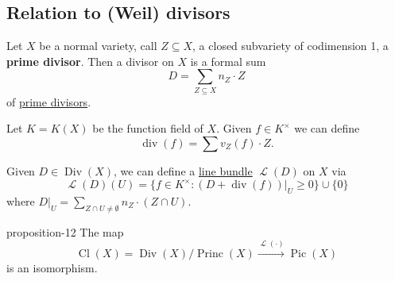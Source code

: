 \documentclass[10pt,]{book}
\newcommand{\terminology}[1]{\textbf{#1}}
\numberwithin{equation}{section}
\newcommand{\sheaf}[1]{\operatorname{\mathcal{#1}}}
\DeclareMathOperator{\divisor}{div}
\DeclareMathOperator{\Cl}{Cl}
\DeclareMathOperator{\Div}{Div}
\DeclareMathOperator{\Pic}{Pic}
\DeclareMathOperator{\Princ}{Princ}
\begin{document}
\subsection[{Relation to (Weil) divisors}]{Relation to (Weil) divisors}\label{sec-reln-weil}
\hypertarget{p-118}{}%
Let \(X\) be a normal variety, call \(Z\subseteq X\), a closed subvariety of codimension 1, a \terminology{prime divisor}. Then a divisor on \(X\) is a formal sum%
\begin{equation*}
D = \sum_{Z\subseteq X} n_Z\cdot Z
\end{equation*}
of \hyperref[sec-reln-weil]{prime divisors}.%
\par
\hypertarget{p-119}{}%
Let \(K = K(X)\) be the function field of \(X\). Given \(f\in K^\times\) we can define%
\begin{equation*}
\divisor (f) = \sum v_Z(f) \cdot Z\text{.}
\end{equation*}
%
\par
\hypertarget{p-120}{}%
Given \(D \in \Div(X)\), we can define a \hyperref[def-line-bundle]{line bundle} \(\sheaf L(D)\) on \(X\) via%
\begin{equation*}
\sheaf L(D)(U) = \{f\in K^\times : (D + \divisor (f))|_U\ge 0 \} \cup \{0\}
\end{equation*}
where \(D|_U = \sum_{Z\cap U\ne \emptyset} n_Z\cdot (Z\cap U)\).%
\begin{proposition}{}{}{proposition-12}%
\hypertarget{p-121}{}%
The map%
\begin{equation*}
\Cl(X) = \Div(X)/\Princ(X) \xrightarrow{\sheaf L(\cdot)} \Pic(X)
\end{equation*}
is an isomorphism.%
\end{proposition}
%
%
\typeout{************************************************}
\typeout{************************************************}
%
\end{document}
